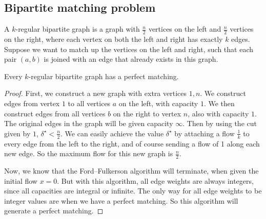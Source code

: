 \subsection{Bipartite matching problem}
A \( k \)-regular bipartite graph is a graph with \( \frac{n}{2} \) vertices on the left and \( \frac{n}{2} \) vertices on the right, where each vertex on both the left and right has exactly \( k \) edges.
Suppose we want to match up the vertices on the left and right, such that each pair \( (a,b) \) is joined with an edge that already exists in this graph.
\begin{theorem}
	Every \( k \)-regular bipartite graph has a perfect matching.
\end{theorem}
\begin{proof}
	First, we construct a new graph with extra vertices \( 1, n \).
	We construct edges from vertex \( 1 \) to all vertices \( a \) on the left, with capacity \( 1 \).
	We then construct edges from all vertices \( b \) on the right to vertex \( n \), also with capacity \( 1 \).
	The original edges in the graph will be given capacity \( \infty \).
	Then by using the cut given by \( { 1 } \), \( \delta^\star < \frac{n}{2} \).
	We can easily achieve the value \( \delta^\star \) by attaching a flow \( \frac{1}{k} \) to every edge from the left to the right, and of course sending a flow of 1 along each new edge.
	So the maximum flow for this new graph is \( \frac{n}{2} \).

	Now, we know that the Ford--Fulkerson algorithm will terminate, when given the initial flow \( x = 0 \).
	But with this algorithm, all edge weights are always integers, since all capacities are integral or infinite.
	The only way for all edge weights to be integer values are when we have a perfect matching.
	So this algorithm will generate a perfect matching.
\end{proof}
